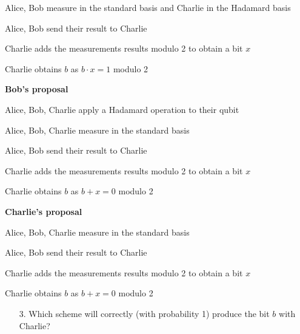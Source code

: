 \begin{exercises}
\begin{protocolEnumerate}
\item Alice, Bob measure in the standard basis and Charlie in the Hadamard basis
\item Alice, Bob send their result to Charlie
\item Charlie adds the measurements results modulo 2 to obtain a bit \(x\)
\item Charlie obtains \(b\) as \(b\cdot x = 1\) modulo 2
\end{protocolEnumerate}
\textbf{Bob's proposal}
\begin{protocolEnumerate}
\item Alice, Bob, Charlie apply a Hadamard operation to their qubit
\item Alice, Bob, Charlie measure in the standard basis
\item Alice, Bob send their result to Charlie
\item Charlie adds the measurements results modulo 2 to obtain a bit \(x\)
\item Charlie obtains \(b\) as \(b+x = 0\) modulo 2
\end{protocolEnumerate}
\textbf{Charlie's proposal}
\begin{protocolEnumerate}
\item Alice, Bob, Charlie measure in the standard basis
\item Alice, Bob send their result to Charlie
\item Charlie adds the measurements results modulo 2 to obtain a bit \(x\)
\item Charlie obtains \(b\) as \(b + x = 0\) modulo 2
\end{protocolEnumerate}
\begin{enumerate}
\item[3.] Which scheme will correctly (with probability 1) produce the bit \(b\) with Charlie?
\end{enumerate}
%

\end{exercises}
